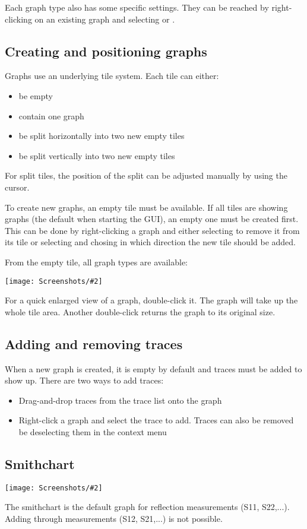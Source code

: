 \documentclass[a4paper,11pt]{article}
\newcommand\info[1][5ex]{%
  \renewcommand\stacktype{L}%
  \scaleto{\stackon[1.2pt]{\color{blue}$\bigcirc$}{\raisebox{-1.5pt}{\small i}}}{#1}%
}
\newenvironment{information}[1][]{%
   \begin{mdframed}[%
      backgroundcolor={blue!15}, hidealllines=true,
      skipabove=0.7\baselineskip, skipbelow=0.7\baselineskip,
      splitbottomskip=2pt, splittopskip=4pt, #1]%
   \makebox[0pt]{%
      \smash{%
         \hspace*{-45pt}%
         \raisebox{-5pt}{%
            {\info}%
         }%
      }%
   }%
}{\end{mdframed}}
\newcommand{\screenshot}[2]{\begin{center}
\texttt{[image: Screenshots/\#2]}
\end{center}}
\begin{document}
Each graph type also has some specific settings. They can be reached by right-clicking on an existing graph and selecting  or .

\subsection{Creating and positioning graphs}
Graphs use an underlying tile system. Each tile can either:
\begin{itemize}
\item be empty
\item contain one graph
\item be split horizontally into two new empty tiles
\item be split vertically into two new empty tiles
\end{itemize}
For split tiles, the position of the split can be adjusted manually by using the cursor.

To create new graphs, an empty tile must be available. If all tiles are showing graphs (the default when starting the GUI), an empty one must be created first. This can be done by right-clicking a graph and either selecting  to remove it from its tile or selecting  and chosing in which direction the new tile should be added.

From the empty tile, all graph types are available:
\screenshot{0.5}{GraphEmptyTile.png}

\begin{information}
For a quick enlarged view of a graph, double-click it. The graph will take up the whole tile area. Another double-click returns the graph to its original size.
\end{information}

\subsection{Adding and removing traces}
When a new graph is created, it is empty by default and traces must be added to show up. There are two ways to add traces:
\begin{itemize}
\item Drag-and-drop traces from the trace list onto the graph
\item Right-click a graph and select the trace to add. Traces can also be removed be deselecting them in the context menu
\end{itemize}

\subsection{Smithchart}
\screenshot{0.6}{GraphSmithchart.png}
The smithchart is the default graph for reflection measurements (S11, S22,...). Adding through measurements (S12, S21,...) is not possible.
\end{document}
